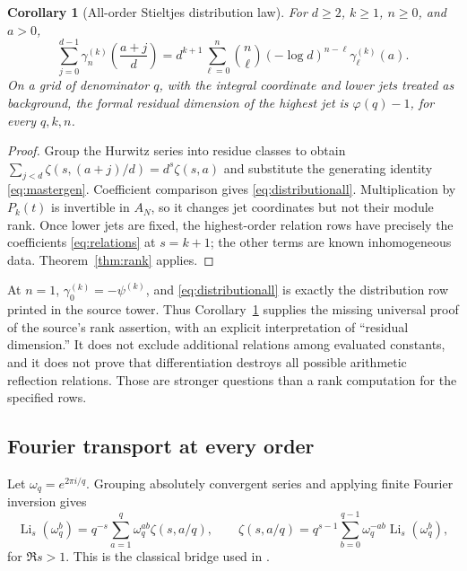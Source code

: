 \documentclass[11pt]{article}
\newtheorem{corollary}[theorem]{Corollary}
\theoremstyle{definition}
\theoremstyle{remark}
\DeclareMathOperator{\Li}{Li}
\begin{document}
\begin{corollary}[All-order Stieltjes distribution law]\label{cor:distribution}
For $d\geq2$, $k\geq1$, $n\geq0$, and $a>0$,
\begin{equation}\label{eq:distributionall}
 \sum_{j=0}^{d-1}\gamma_n^{(k)}\left(\frac{a+j}{d}\right)
  =d^{k+1}\sum_{\ell=0}^n\binom n\ell
       (-\log d)^{n-\ell}\gamma_\ell^{(k)}(a).
\end{equation}
On a grid of denominator $q$, with the integral coordinate and lower jets treated as background, the formal residual dimension of the highest jet is $\varphi(q)-1$, for every $q,k,n$.
\end{corollary}
\begin{proof}
Group the Hurwitz series into residue classes to obtain
$\sum_{j<d}\zeta(s,(a+j)/d)=d^s\zeta(s,a)$ and substitute the generating identity \eqref{eq:mastergen}. Coefficient comparison gives \eqref{eq:distributionall}. Multiplication by $P_k(t)$ is invertible in $A_N$, so it changes jet coordinates but not their module rank. Once lower jets are fixed, the highest-order relation rows have precisely the coefficients \eqref{eq:relations} at $s=k+1$; the other terms are known inhomogeneous data. Theorem~\ref{thm:rank} applies.
\end{proof}

At $n=1$, $\gamma_0^{(k)}=-\psi^{(k)}$, and \eqref{eq:distributionall} is exactly the distribution row printed in the source tower. Thus Corollary~\ref{cor:distribution} supplies the missing universal proof of the source's rank assertion, with an explicit interpretation of ``residual dimension.'' It does not exclude additional relations among evaluated constants, and it does not prove that differentiation destroys all possible arithmetic reflection relations. Those are stronger questions than a rank computation for the specified rows.

\subsection{Fourier transport at every order}
Let $\omega_q=e^{2\pi i/q}$. Grouping absolutely convergent series and applying finite Fourier inversion gives
\begin{equation}\label{eq:DFT}
 \Li_s(\omega_q^b)=q^{-s}\sum_{a=1}^q\omega_q^{ab}\zeta(s,a/q),
 \qquad
 \zeta(s,a/q)=q^{s-1}\sum_{b=0}^{q-1}\omega_q^{-ab}\Li_s(\omega_q^b),
\end{equation}
for $\Re s>1$. This is the classical bridge used in \cite{RepoBridge}.
\end{document}
